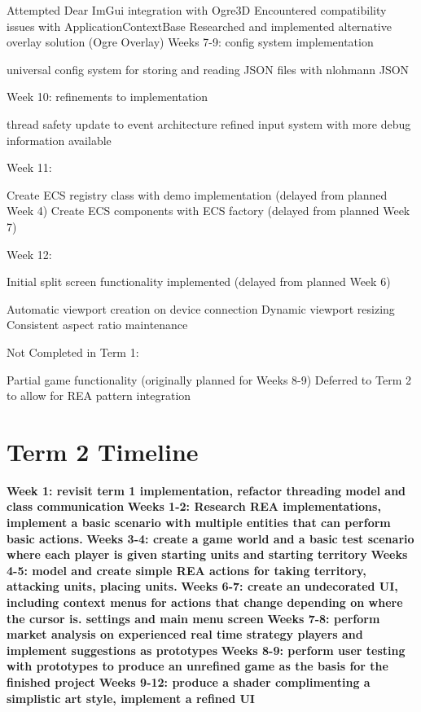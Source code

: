 \documentclass[]{final_report}
\begin{document}
Attempted Dear ImGui integration with Ogre3D
Encountered compatibility issues with ApplicationContextBase
Researched and implemented alternative overlay solution (Ogre Overlay)
Weeks 7-9:
config system implementation

universal config system for storing and reading JSON files with nlohmann JSON

Week 10:
refinements to implementation

thread safety update to event architecture
refined input system with more debug information available

Week 11:

Create ECS registry class with demo implementation (delayed from planned Week 4)
Create ECS components with ECS factory (delayed from planned Week 7)

Week 12:

Initial split screen functionality implemented (delayed from planned Week 6)

Automatic viewport creation on device connection
Dynamic viewport resizing
Consistent aspect ratio maintenance



Not Completed in Term 1:

Partial game functionality (originally planned for Weeks 8-9)
Deferred to Term 2 to allow for REA pattern integration
 
\section{Term 2 Timeline}
\textbf{Week 1: revisit term 1 implementation, refactor threading model and class communication} \newline
\textbf{Weeks 1-2: Research REA implementations, implement a basic scenario with multiple entities that can perform basic actions. } \newline
\textbf{Weeks 3-4: create a game world and a basic test scenario where each player is given starting units and starting territory} \newline
\textbf{Weeks 4-5: model and create simple REA actions for taking territory, attacking units, placing units.} \newline
\textbf{Weeks 6-7: create an undecorated UI, including context menus for actions that change depending on where the cursor is. settings and main menu screen} \newline
\textbf{Weeks 7-8: perform market analysis on experienced real time strategy players and implement suggestions as prototypes} \newline
\textbf{Weeks 8-9: perform user testing with prototypes to produce an unrefined game as the basis for the finished project} \newline
\textbf{Weeks 9-12: produce a shader complimenting a simplistic art style, implement a refined UI} \newline
\end{document}
